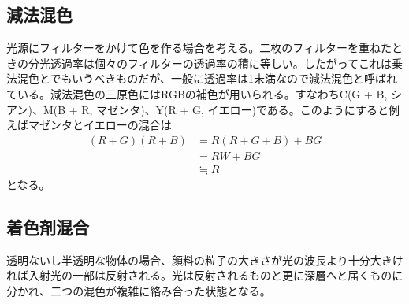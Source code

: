 		\subsection{減法混色}
			光源にフィルターをかけて色を作る場合を考える。二枚のフィルターを重ねたときの分光透過率は個々のフィルターの透過率の積に等しい。したがってこれは乗法混色とでもいうべきものだが、一般に透過率は1未満なので減法混色と呼ばれている。減法混色の三原色にはRGBの補色が用いられる。すなわちC(G + B, シアン)、M(B + R, マゼンタ)、Y(R + G, イエロー)である。このようにすると例えばマゼンタとイエローの混合は
			\begin{align*}
				(R + G)(R + B) &= R(R + G + B) + BG\\
				&= RW + BG \\
				&\fallingdotseq R
			\end{align*}
			となる。
		\subsection{着色剤混合}
			透明ないし半透明な物体の場合、顔料の粒子の大きさが光の波長より十分大きければ入射光の一部は反射される。光は反射されるものと更に深層へと届くものに分かれ、二つの混色が複雑に絡み合った状態となる。